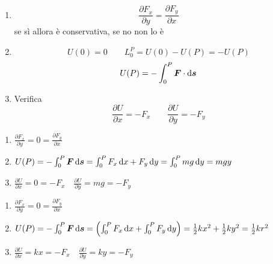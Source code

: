 \begin{enumerate}
\item$$\frac {\partial F_x}{\partial y}=\frac {\partial
F_y}{\partial x}$$ se sì allora è conservativa, se no non lo è

\item\begin{equation*}U(0)=0 \qquad L_0^P=U(0)-U(P)=-U(P)\end{equation*}
\begin{equation*}U(P)=-\int_0^P \boldsymbol{F}\cdot\mathrm{d} \boldsymbol{s}\end{equation*}

\item Verifica
\begin{equation*}\frac {\partial U}{\partial x}=-F_x \qquad \frac{\partial U}{\partial y}=-F_y\end{equation*}
\end{enumerate}
\begin{Es}[Forza peso $F_x=0 \quad F_y=mg$]
\begin{enumerate}
\item $\frac {\partial F_x}{\partial y}=0=\frac {\partial
F_y}{\partial x}$

\item $U(P)=-\int_0^P  \boldsymbol{F}\, \mathrm{d} \boldsymbol{s}=\int_0^P F_x\, \mathrm{d} x+F_y\, \mathrm{d}
y=\int_0^P mg \, \mathrm{d} y = mgy$

\item $\frac {\partial U}{\partial x}=0=-F_x\quad \frac {\partial
U}{\partial y}=mg=-F_y$
\end{enumerate}
\end{Es}
\begin{Es}[Forza elastica $F_x=-kx \quad F_y=-ky$]
\begin{enumerate}
\item$\frac {\partial F_x}{\partial y}=0=\frac {\partial
F_y}{\partial x}$

\item$U(P)=-\int_0^P \boldsymbol{F}\, \mathrm{d} \boldsymbol{s}=\left(\int_0^P F_x\, \mathrm{d} x+\int_0^P
F_y\, \mathrm{d} y \right)=\frac
{1}{2}kx^2+\frac{1}{2}ky^2=\frac{1}{2}kr^2$

\item$\frac{\partial U}{\partial x}=kx=-F_x \quad \frac{\partial
U}{\partial y}=ky=-F_y$
\end{enumerate}
\end{Es}
